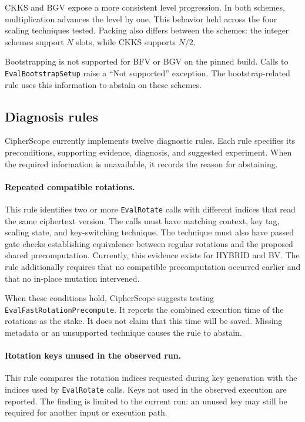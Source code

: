 \documentclass[pdflatex,sn-basic,Numbered,iicol]{sn-jnl}
\begin{document}
CKKS and BGV expose a more consistent level progression. In both schemes,
multiplication advances the level by one. This behavior held across the four
scaling techniques tested. Packing also differs between the schemes: the
integer schemes support $N$ slots, while CKKS supports $N/2$.

Bootstrapping is not supported for BFV or BGV on the pinned build. Calls to
\texttt{EvalBootstrapSetup} raise a ``Not supported'' exception. The
bootstrap-related rule uses this information to abstain on these schemes.

\subsection{Diagnosis rules}
\label{sec:rules}

CipherScope currently implements twelve diagnostic rules. Each rule specifies
its preconditions, supporting evidence, diagnosis, and suggested experiment.
When the required information is unavailable, it records the reason for
abstaining.

\paragraph{Repeated compatible rotations.} This rule identifies two or more
\texttt{EvalRotate} calls with different indices that read the same
ciphertext version. The calls must have matching context, key tag, scaling
state, and key-switching technique. The technique must also have passed gate
checks establishing equivalence between regular rotations and the proposed
shared precomputation. Currently, this evidence exists for HYBRID and BV. The
rule additionally requires that no compatible precomputation occurred earlier
and that no in-place mutation intervened.

When these conditions hold, CipherScope suggests testing
\texttt{EvalFastRotationPrecompute}. It reports the combined execution time of
the rotations as the stake. It does not claim that this time will be saved.
Missing metadata or an unsupported technique causes the rule to abstain.

\paragraph{Rotation keys unused in the observed run.} This rule compares the
rotation indices requested during key generation with the indices used by
\texttt{EvalRotate} calls. Keys not used in the observed execution are
reported. The finding is limited to the current run: an unused key may still
be required for another input or execution path.
\end{document}
